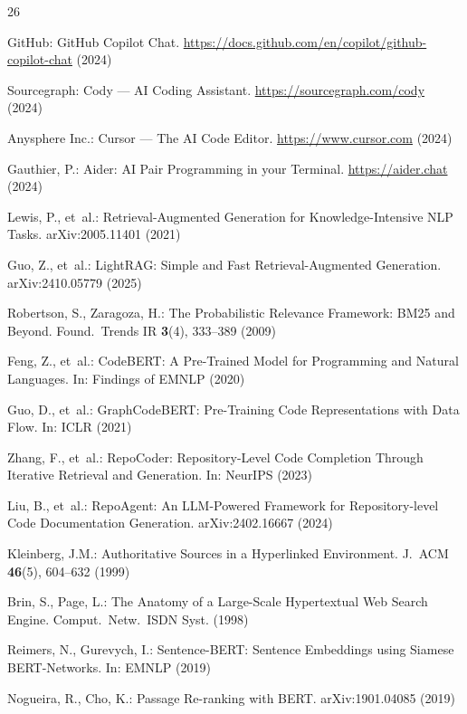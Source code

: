 \documentclass[runningheads]{llncs}
\begin{document}
\begin{thebibliography}{26}

GitHub: GitHub Copilot Chat.
\url{https://docs.github.com/en/copilot/github-copilot-chat} (2024)

Sourcegraph: Cody --- AI Coding Assistant.
\url{https://sourcegraph.com/cody} (2024)

Anysphere Inc.: Cursor --- The AI Code Editor.
\url{https://www.cursor.com} (2024)

Gauthier, P.: Aider: AI Pair Programming in your Terminal.
\url{https://aider.chat} (2024)

Lewis, P., et~al.: Retrieval-Augmented Generation for
Knowledge-Intensive NLP Tasks. arXiv:2005.11401 (2021)

Guo, Z., et~al.: LightRAG: Simple and Fast
Retrieval-Augmented Generation. arXiv:2410.05779 (2025)

Robertson, S., Zaragoza, H.: The Probabilistic Relevance
Framework: BM25 and Beyond.
Found.\ Trends IR \textbf{3}(4), 333--389 (2009)

Feng, Z., et~al.: CodeBERT: A Pre-Trained Model for Programming
and Natural Languages. In: Findings of EMNLP (2020)

Guo, D., et~al.: GraphCodeBERT: Pre-Training Code Representations
with Data Flow. In: ICLR (2021)

Zhang, F., et~al.: RepoCoder: Repository-Level Code Completion
Through Iterative Retrieval and Generation. In: NeurIPS (2023)

Liu, B., et~al.: RepoAgent: An LLM-Powered Framework for
Repository-level Code Documentation Generation.
arXiv:2402.16667 (2024)

Kleinberg, J.M.: Authoritative Sources in a Hyperlinked
Environment. J.\ ACM \textbf{46}(5), 604--632 (1999)

Brin, S., Page, L.: The Anatomy of a Large-Scale Hypertextual
Web Search Engine. Comput.\ Netw.\ ISDN Syst. (1998)

Reimers, N., Gurevych, I.: Sentence-BERT: Sentence Embeddings
using Siamese BERT-Networks. In: EMNLP (2019)

Nogueira, R., Cho, K.: Passage Re-ranking with BERT.
arXiv:1901.04085 (2019)


\end{thebibliography}
\end{document}
